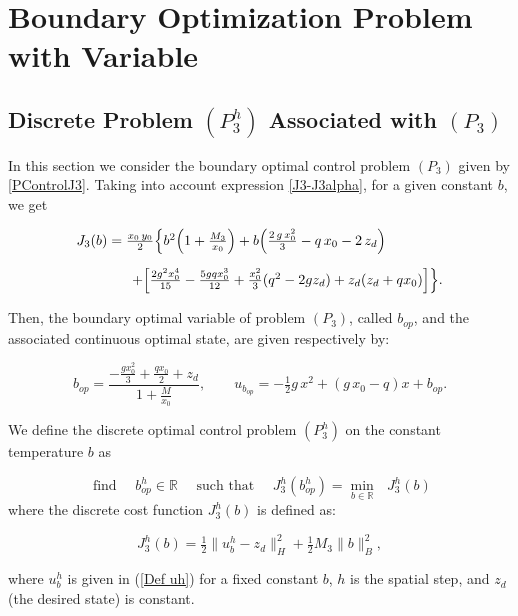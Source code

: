 \documentclass[axioms,article,submit,moreauthors]{Definitions/mdpi}
\begin{document}
\section{Boundary Optimization Problem with Variable }\label{sec5}

\subsection{Discrete Problem  ${(P^h_{3})}$ Associated with $(P_3)$} 
In this section we consider the boundary optimal control problem  $(P_3)$ given by \eqref{PControlJ3}. 
Taking into account expression \eqref{J3-J3alpha}, for a given constant $b$, we get
    
    \begin{equation}\label{J3-explicito}
    \begin{array}{ll}
     J_3(b)=\tfrac{x_0\,y_0}{2}\Big\{ b^2 \Big(1+ \tfrac{M_3}{x_0} \Big) + b   \Big( \tfrac{2\,g\,x_0^2 }{3}- q\,x_0 - 2\,z_d \Big) \\[0.45cm]
     \hspace{1.4cm}+\Big [\tfrac{2g^2 x_0^4}{15} -\tfrac{5 g q x_0^3}{12} + \tfrac{x_0^2}{3} (q^2-2 g z_d) + z_d(z_d + q x_0) \Big]\Big\}.
     \end{array} 
    \end{equation}

    \noindent Then, the boundary optimal variable of problem $(P_3)$, called $b_{op}$, and the associated continuous optimal state, are given respectively by:
    
    \begin{equation}\label{bop-ubop}
     b_{op}= \frac{-\tfrac{g x_0^2}{3} + \tfrac{q x_0}{2} + z_d}{1+ \tfrac{M}{x_0}}, \qquad 
     u_{b_{op}}=  -\tfrac{1}{2} g\, x^2 + (g\, x_0 - q) x +b_{op}.
    \end{equation}

We define the discrete optimal control problem ${(P^h_{3})}$ on the constant temperature $b$ as

\[ \text{ find }\quad {b^h_{op}}\in \mathbb{R}\quad\text{ such that }\quad
{J^h_{3}}({b^h_{op}})=\min\limits_{b\in \mathbb{R}} \text{ }{J^h_{3}}(b)
\]
where the discrete cost function  ${J^h_{3}}(b)$ is defined as:
    
     \[{J^h_{3}} (b)=  \tfrac{1}{2} \lVert {u^h_b} - z_d \rVert^2_H +  \tfrac{1}{2} M_3 \lVert b \rVert ^2_B, \]
     
 \noindent where ${u^h_b}$ is given in (\ref{Def uh}) {for a fixed constant $b$}, $h$ is the spatial step, and $z_d$ (the desired state) is constant.
 
\end{document}
